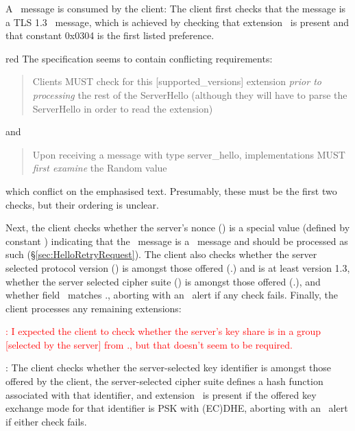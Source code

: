 \begin{sloppypar}
A \ServerHello\ message is consumed by the client: The client first checks that
the message is a TLS 1.3 \ServerHello\ message, which is achieved by checking 
that extension \TLSsupportedVersions\ is present and that constant 0x0304 is
the first listed preference. 
\ifSpecNotes
\begin{color}{red}
The specification seems to contain conflicting requirements:
\begin{quote}
  Clients MUST check for this [supported_versions] extension \emph{prior to
  processing} the rest of the ServerHello (although they will have to           
  parse the ServerHello in order to read the extension)
\end{quote}
and 
\begin{quote}
  Upon receiving a message with type server_hello, implementations MUST      
  \emph{first examine} the Random value
\end{quote}
which conflict on the emphasised text. Presumably, these must be the 
first two checks, but their ordering is unclear.
\end{color}
\fi
Next, the client checks whether the server's nonce 
(\TLSrandom) is a special value (defined by constant 
) indicating that the \ServerHello\ message
is a \HelloRetryRequest\ message and should be processed as such 
(\S\ref{sec:HelloRetryRequest}). \ifPresentationNotes{}\fi
The client also checks whether \label{comp:SH:cons:version} the server selected protocol version
(\TLSsupportedVersions) is amongst those offered (\ClientHello.\TLSsupportedVersions)
and is at least version 1.3, whether the server selected cipher suite
(\TLScipherSuite) is amongst those offered (\ClientHello.\TLScipherSuites),
and whether field \TLSlegacySessionIdEcho\ matches 
\ClientHello.\TLSlegacySessionId, aborting with an \TLSillegalParameter\
alert if any check fails. Finally, the client processes any remaining 
extensions:
\end{sloppypar}


\begin{description}
\ifSpecNotes
\item   \textcolor{red}{\TLSkeyShare: 
    I expected the client to check whether the server's key share is 
    in a group [selected by the server] from \ClientHello.\TLSsupportedGroups, 
    but that doesn't seem to be required.}
\fi

\item \TLSpsk: The client checks whether the server-selected key 
  identifier is amongst those offered by the client, 
  the server-selected cipher suite defines a hash function associated 
  with that identifier, and 
  extension \TLSkeyShare\ is present if the offered key exchange 
  mode for that identifier is PSK with (EC)DHE, aborting with an 
  \TLSillegalParameter\ alert if either check fails.
\end{description}


